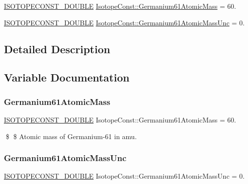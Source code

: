 \begin{DoxyCompactItemize}
\item 
\mbox{\hyperlink{group___isotope_const-_macros_ga8f45a7272ce02c0b4c65c44636ed719a}{I\+S\+O\+T\+O\+P\+E\+C\+O\+N\+S\+T\+\_\+\+D\+O\+U\+B\+LE}} \mbox{\hyperlink{group___isotope_const-_germanium-_ge61_gae91ce03d6fa92a7f7993c23d1f9ec517}{Isotope\+Const\+::\+Germanium61\+Atomic\+Mass}} = 60.
\item 
\mbox{\hyperlink{group___isotope_const-_macros_ga8f45a7272ce02c0b4c65c44636ed719a}{I\+S\+O\+T\+O\+P\+E\+C\+O\+N\+S\+T\+\_\+\+D\+O\+U\+B\+LE}} \mbox{\hyperlink{group___isotope_const-_germanium-_ge61_gad9ed1bfe061dff9d7c438f8dc148352c}{Isotope\+Const\+::\+Germanium61\+Atomic\+Mass\+Unc}} = 0.
\end{DoxyCompactItemize}


\subsection{Detailed Description}


\subsection{Variable Documentation}
\mbox{\label{group___isotope_const-_germanium-_ge61_gae91ce03d6fa92a7f7993c23d1f9ec517}} 
\subsubsection{\texorpdfstring{Germanium61\+Atomic\+Mass}{Germanium61AtomicMass}}
{\footnotesize\ttfamily \mbox{\hyperlink{group___isotope_const-_macros_ga8f45a7272ce02c0b4c65c44636ed719a}{I\+S\+O\+T\+O\+P\+E\+C\+O\+N\+S\+T\+\_\+\+D\+O\+U\+B\+LE}} Isotope\+Const\+::\+Germanium61\+Atomic\+Mass = 60.}

\$ \$ Atomic mass of Germanium-\/61 in amu. \mbox{\label{group___isotope_const-_germanium-_ge61_gad9ed1bfe061dff9d7c438f8dc148352c}} 
\subsubsection{\texorpdfstring{Germanium61\+Atomic\+Mass\+Unc}{Germanium61AtomicMassUnc}}
{\footnotesize\ttfamily \mbox{\hyperlink{group___isotope_const-_macros_ga8f45a7272ce02c0b4c65c44636ed719a}{I\+S\+O\+T\+O\+P\+E\+C\+O\+N\+S\+T\+\_\+\+D\+O\+U\+B\+LE}} Isotope\+Const\+::\+Germanium61\+Atomic\+Mass\+Unc = 0.}

